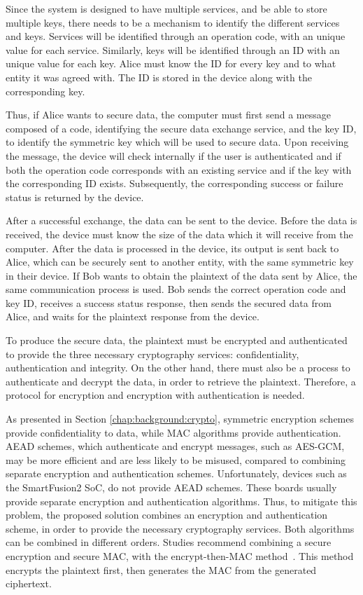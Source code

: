 Since the system is designed to have multiple services, and be able to store multiple keys, there needs to be a mechanism to identify the different services and keys.
Services will be identified through an operation code, with an unique value for each service. Similarly, keys will be identified through an ID with an unique value for each key. Alice must know the ID for every key and to what entity it was agreed with. The ID is stored in the device along with the corresponding key.

Thus, if Alice wants to secure data, the computer must first send a message composed of a code, identifying the secure data exchange service, and the key ID, to identify the symmetric key which will be used to secure data.
Upon receiving the message, the device will check internally if the user is authenticated and if both the operation code corresponds with an existing service and if the key with the corresponding ID exists.
Subsequently, the corresponding success or failure status is returned by the device.

After a successful exchange, the data can be sent to the device. Before the data is received, the device must know the size of the data which it will receive from the computer. %
After the data is processed in the device, its output is sent back to Alice, which can be securely sent to another entity, with the same symmetric key in their device.
If Bob wants to obtain the plaintext of the data sent by Alice, the same communication process is used. Bob sends the correct operation code and key ID, receives a success status response, then sends the secured data from Alice, and waits for the plaintext response from the device.

To produce the secure data, the plaintext must be encrypted and authenticated to provide the three necessary cryptography services: confidentiality, authentication and integrity.
On the other hand, there must also be a process to authenticate and decrypt the data, in order to retrieve the plaintext. Therefore, a protocol for encryption and encryption with authentication is needed.

As presented in Section \ref{chap:background:crypto}, symmetric encryption schemes provide confidentiality to data, while MAC algorithms provide authentication. AEAD schemes, which authenticate and encrypt messages, such as AES-GCM, may be more efficient and are less likely to be misused, compared to combining separate encryption and authentication schemes.
Unfortunately, devices such as the SmartFusion2 SoC, do not provide AEAD schemes. These boards usually provide separate encryption and authentication algorithms.
Thus, to mitigate this problem, the proposed solution combines an encryption and authentication scheme, in order to provide the necessary cryptography services.
Both algorithms can be combined in different orders. Studies recommend combining a secure encryption and secure MAC, with the encrypt-then-MAC method~\cite{encryptmacorder}. This method encrypts the plaintext first, then generates the MAC from the generated ciphertext.

